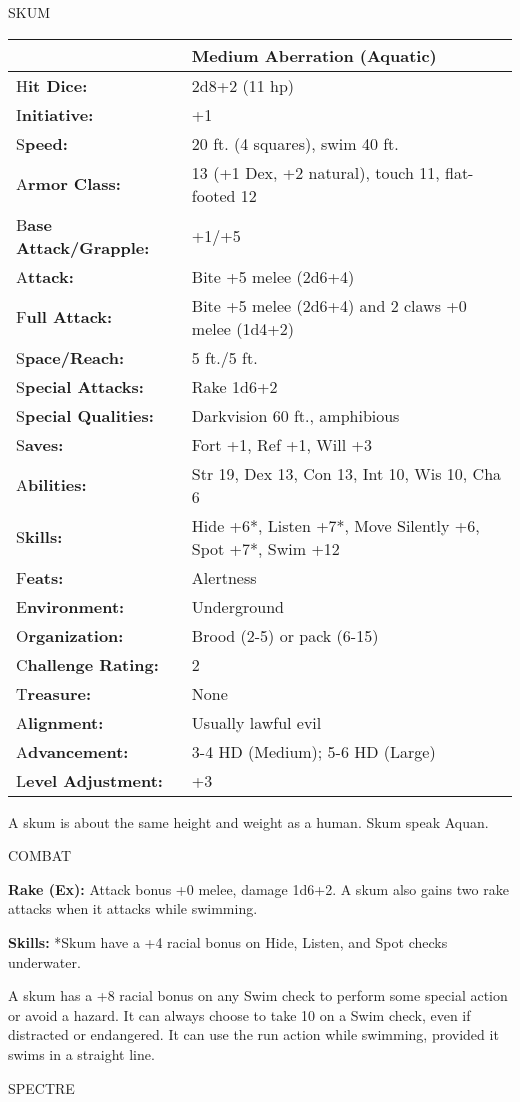 \documentclass{article}
\begin{document}
\vspace{12pt}
{\LARGE{}SKUM}

\begin{tabular}{|>{\raggedright}p{88pt}|>{\raggedright}p{237pt}|}
\hline
  & Medium Aberration (Aquatic)\tabularnewline
\hline
H\textbf{it Dice:} & 2d8+2 (11 hp)\tabularnewline
\hline
I\textbf{nitiative:} & +1\tabularnewline
\hline
S\textbf{peed:} & 20 ft. (4 squares), swim 40 ft.\tabularnewline
\hline
A\textbf{rmor Class:} & 13 (+1 Dex, +2 natural), touch 11, flat-footed 12\tabularnewline
\hline
B\textbf{ase Attack/Grapple:} & +1/+5\tabularnewline
\hline
A\textbf{ttack:} & Bite +5 melee (2d6+4)\tabularnewline
\hline
F\textbf{ull Attack:} & Bite +5 melee (2d6+4) and 2 claws +0 melee (1d4+2)\tabularnewline
\hline
S\textbf{pace/Reach:} & 5 ft./5 ft.\tabularnewline
\hline
S\textbf{pecial Attacks:} & Rake 1d6+2\tabularnewline
\hline
S\textbf{pecial Qualities:} & Darkvision 60 ft., amphibious\tabularnewline
\hline
S\textbf{aves:} & Fort +1, Ref +1, Will +3\tabularnewline
\hline
A\textbf{bilities:} & Str 19, Dex 13, Con 13, Int 10, Wis 10, Cha 6\tabularnewline
\hline
S\textbf{kills:} & Hide +6*, Listen +7*, Move Silently +6, Spot +7*, Swim +12\tabularnewline
\hline
F\textbf{eats:} & Alertness\tabularnewline
\hline
E\textbf{nvironment:} & Underground\tabularnewline
\hline
O\textbf{rganization:} & Brood (2-5) or pack (6-15)\tabularnewline
\hline
C\textbf{hallenge Rating:} & 2\tabularnewline
\hline
T\textbf{reasure:} & None\tabularnewline
\hline
A\textbf{lignment:} & Usually lawful evil\tabularnewline
\hline
A\textbf{dvancement:} & 3-4 HD (Medium); 5-6 HD (Large)\tabularnewline
\hline
L\textbf{evel Adjustment:} & +3\tabularnewline
\hline
\end{tabular}

A skum is about the same height and weight as a human. Skum speak Aquan.

COMBAT

\textbf{Rake (Ex):} Attack bonus +0 melee, damage 1d6+2. A skum also gains two 
rake attacks when it attacks while swimming.

\textbf{Skills:} *Skum have a +4 racial bonus on Hide, Listen, and Spot checks 
underwater.

A skum has a +8 racial bonus on any Swim check to perform some special action or 
avoid a hazard. It can always choose to take 10 on a Swim check, even if distracted 
or endangered. It can use the run action while swimming, provided it swims in a 
straight line.

\vspace{12pt}
{\LARGE{}SPECTRE}
\end{document}
